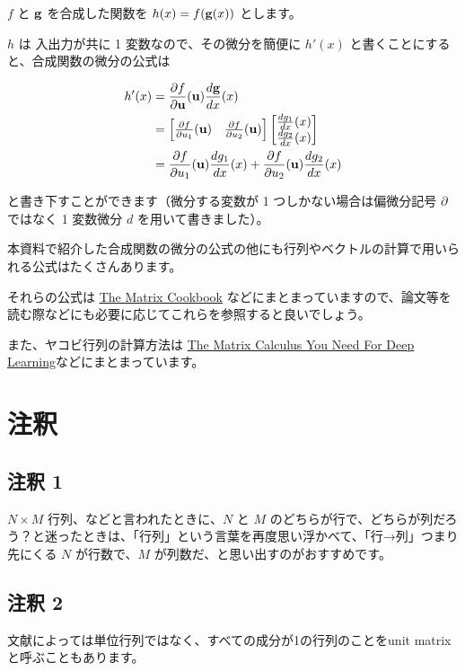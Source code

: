 $f$ と ${\bf g}$ を合成した関数を $h(x) = f({\bf g}(x))$ とします。

$h$ は 入出力が共に 1 変数なので、その微分を簡便に $h'(x)$ と書くことにすると、合成関数の微分の公式は


\begin{align*}
h'(x) &=
\frac{\partial f}{\partial {\bf u}} ({\bf u}) \frac{d {\bf g}}{d x} (x)\\
&= \begin{bmatrix}
\frac{\partial f}{\partial u_1} ({\bf u}) & \frac{\partial f}{\partial u_2} ({\bf u})
\end{bmatrix}
\begin{bmatrix}
\frac{d g_1}{d x} (x) \\
\frac{d g_2}{d x} (x)
\end{bmatrix} \\
&=
\frac{\partial f}{\partial u_1} ({\bf u})\frac{d g_1}{d x}(x) +
\frac{\partial f}{\partial u_2} ({\bf u})\frac{d g_2}{d x}(x)
\end{align*}


と書き下すことができます（微分する変数が 1 つしかない場合は偏微分記号 $\partial$ ではなく 1 変数微分 $d$ を用いて書きました）。


本資料で紹介した合成関数の微分の公式の他にも行列やベクトルの計算で用いられる公式はたくさんあります。

それらの公式は \href{https://www.math.uwaterloo.ca/~hwolkowi/matrixcookbook.pdf}{The Matrix Cookbook} などにまとまっていますので、論文等を読む際などにも必要に応じてこれらを参照すると良いでしょう。

また、ヤコビ行列の計算方法は \href{https://arxiv.org/abs/1802.01528}{The Matrix Calculus You Need For Deep Learning}などにまとまっています。


\section{注釈}


\subsection{注釈 1}
\label{06a-basics-of-linear-algebra-note1}


$N \times M$ 行列、などと言われたときに、$N$ と $M$ のどちらが行で、どちらが列だろう？と迷ったときは、「行列」という言葉を再度思い浮かべて、「行→列」つまり先にくる $N$ が行数で、$M$ が列数だ、と思い出すのがおすすめです。


\subsection{注釈 2}
\label{06a-basics-of-linear-algebra-note2}


文献によっては単位行列ではなく、すべての成分が1の行列のことをunit matrixと呼ぶこともあります。
